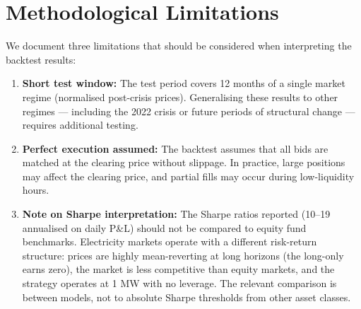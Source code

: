 \section{Methodological Limitations}

We document three limitations that should be considered when interpreting the backtest results:

\begin{enumerate}
  \item \textbf{Short test window:} The test period covers 12 months of a single market regime (normalised post-crisis prices). Generalising these results to other regimes — including the 2022 crisis or future periods of structural change — requires additional testing.

  \item \textbf{Perfect execution assumed:} The backtest assumes that all bids are matched at the clearing price without slippage. In practice, large positions may affect the clearing price, and partial fills may occur during low-liquidity hours.

  \item \textbf{Note on Sharpe interpretation:} The Sharpe ratios reported (10--19 annualised on daily P\&L) should not be compared to equity fund benchmarks. Electricity markets operate with a different risk-return structure: prices are highly mean-reverting at long horizons (the long-only earns zero), the market is less competitive than equity markets, and the strategy operates at 1 MW with no leverage. The relevant comparison is between models, not to absolute Sharpe thresholds from other asset classes.
\end{enumerate}
